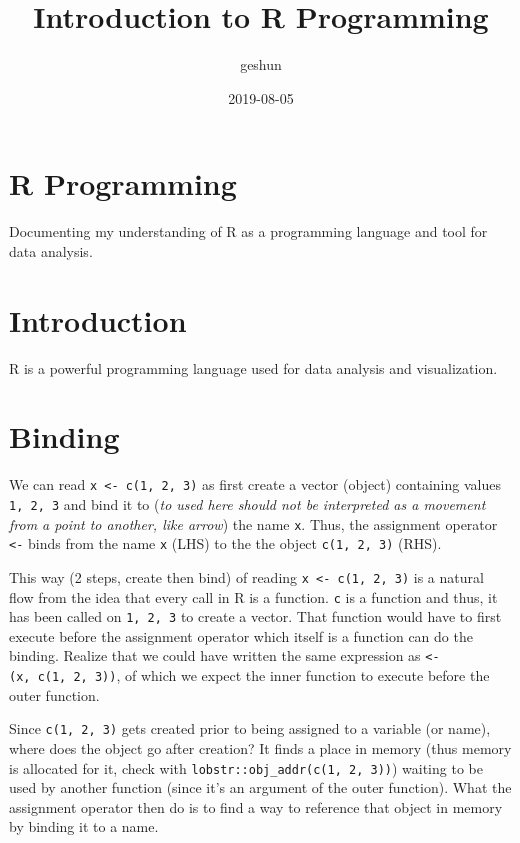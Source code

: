 \documentclass[]{book}
\title{Introduction to R Programming}
\author{geshun}
\date{2019-08-05}
\begin{document}
\maketitle

{
\setcounter{tocdepth}{1}
\tableofcontents
}
\hypertarget{r-programming}{%
\chapter*{R Programming}\label{r-programming}}

Documenting my understanding of R as a programming language and tool for data analysis.

\hypertarget{introduction}{%
\chapter{Introduction}\label{introduction}}

R is a powerful programming language used for data analysis and visualization.

\hypertarget{binding}{%
\chapter{Binding}\label{binding}}

We can read \texttt{x\ \textless{}-\ c(1,\ 2,\ 3)} as first create a vector (object) containing values \texttt{1,\ 2,\ 3} and bind it to (\emph{to used here should not be interpreted as a movement from a point to another, like arrow}) the name \texttt{x}. Thus, the assignment operator \texttt{\textless{}-} binds from the name \texttt{x} (LHS) to the the object \texttt{c(1,\ 2,\ 3)} (RHS).

This way (2 steps, create then bind) of reading \texttt{x\ \textless{}-\ c(1,\ 2,\ 3)} is a natural flow from the idea that every call in R is a function. \texttt{c} is a function and thus, it has been called on \texttt{1,\ 2,\ 3} to create a vector. That function would have to first execute before the assignment operator which itself is a function can do the binding. Realize that we could have written the same expression as \texttt{\textasciigrave{}\textless{}-\textasciigrave{}(x,\ c(1,\ 2,\ 3))}, of which we expect the inner function to execute before the outer function.

Since \texttt{c(1,\ 2,\ 3)} gets created prior to being assigned to a variable (or name), where does the object go after creation? It finds a place in memory (thus memory is allocated for it, check with \texttt{lobstr::obj\_addr(c(1,\ 2,\ 3))}) waiting to be used by another function (since it's an argument of the outer function). What the assignment operator then do is to find a way to reference that object in memory by binding it to a name.
\end{document}
